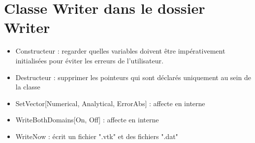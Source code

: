 \documentclass[french]{article}
\newcommand{\valentin}{\hfill{\color{blue}{Valentin}}}
\begin{document}
\section{Classe Writer dans le dossier Writer}
\begin{itemize}
\item Constructeur : regarder quelles variables doivent être impérativement initialisées pour éviter les erreurs de l'utilisateur.
\item Destructeur : supprimer les pointeurs qui sont déclarés uniquement au sein de la classe
\item SetVector[Numerical, Analytical, ErrorAbs] : affecte en interne
\item WriteBothDomains[On, Off] : affecte en interne
\item WriteNow : écrit un fichier ".vtk" et des fichiers ".dat" \valentin
\end{itemize}
\end{document}
